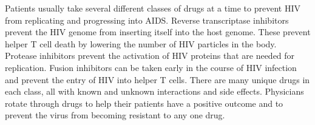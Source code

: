 Patients usually take several different classes of drugs at a time to prevent HIV from replicating and progressing into AIDS.
Reverse transcriptase inhibitors prevent the HIV genome from inserting itself into the host genome.
These prevent helper T cell death by lowering the number of HIV particles in the body.
Protease inhibitors prevent the activation of HIV proteins that are needed for replication.
Fusion inhibitors can be taken early in the course of HIV infection and prevent the entry of HIV into helper T cells.
There are many unique drugs in each class, all with known and unknown interactions and side effects.
Physicians rotate through drugs to help their patients have a positive outcome and to prevent the virus from becoming resistant to any one drug.